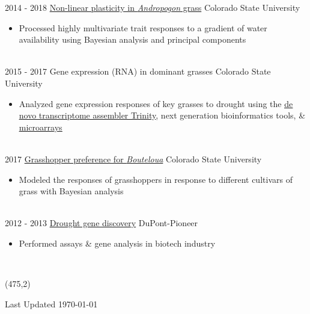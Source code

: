 \documentclass[letterpaper]{twentysecondcv} %
\begin{document}
\begin{twenty}
	\twentyitem
    	{2014 -}
		{2018}
        {\href{https://github.com/avahoffman/nonlinear-plasticity}{Non-linear plasticity in \textit{Andropogon} grass}}
        {Colorado State University}
        {}
        {
        \vspace{-2mm}
        {\begin{itemize}
        \item Processed highly multivariate trait responses to a gradient of water availability using Bayesian analysis and principal components
    \end{itemize}}
        }
    \\   
    	\twentyitem
    	{2015 -}
		{2017}
        {Gene expression (RNA) in dominant grasses}
        {Colorado State University}
        {}
        {
        \vspace{-2mm}
        {\begin{itemize}
        \item Analyzed gene expression responses of key grasses to drought using the \href{https://github.com/avahoffman/gene-expression}{\underline{de novo transcriptome assembler Trinity}}, next generation bioinformatics tools, \& \href{https://github.com/avahoffman/climate-extremes-gene-expression}{\underline{microarrays}}
    \end{itemize}}
        }
    \\   
        	\twentyitem
    	{2017}
		{}
        {\href{https://github.com/avahoffman/grasshopper-preference}{Grasshopper preference for \textit{Bouteloua}}}
        {Colorado State University}
        {}
        {
        \vspace{-2mm}
        {\begin{itemize}
        \item Modeled the responses of grasshoppers in response to different cultivars of grass with Bayesian analysis
    \end{itemize}}
        }
    \\   
\twentyitem
    	{2012 -}
		{2013}
        {\href{}{Drought gene discovery}}
        {DuPont-Pioneer}
        {}
        {
        \vspace{-2mm}
        {\begin{itemize}
        \item Performed assays \& gene analysis in biotech industry
    \end{itemize}}
        }
    \\   

\end{twenty}

\begin{textblock*}{4cm}(475,2) %
\color{mainblue}\fontsize{8pt}{10pt}\selectfont %
\begin{flushright}
Last Updated \today %
\end{flushright}
\end{textblock*}
\end{document}
